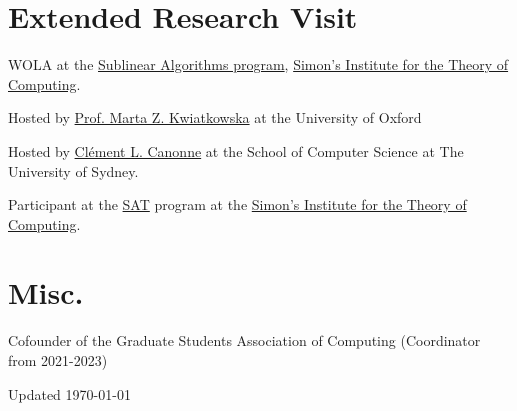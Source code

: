 \documentclass[12pt,letterpaper]{report}
\begin{document}
	\section*{ Extended Research Visit}
	\begin{tablist}
		
		
		\item[2024]
		WOLA at the \href{https://simons.berkeley.edu/programs/sublinear-algorithms/}{Sublinear Algorithms program}, \href{https://simons.berkeley.edu/}{Simon's Institute for the Theory of Computing}.
		
		\item[2024]    Hosted by  \href{https://ccanonne.github.io/}{Prof. Marta Z. Kwiatkowska} at the University of Oxford
		
		\item[2023]
		Hosted by \href{https://ccanonne.github.io/}{Clément L. Canonne} at the School of Computer Science at The University of Sydney. 
		
		\item[2022]
		Participant at the \href{https://simons.berkeley.edu/programs/sat2021}{SAT} program at the \href{https://simons.berkeley.edu/}{Simon's Institute for the Theory of Computing}.
		
	\end{tablist}
	
	\section*{Misc.}
	\begin{tablist}
		\item[2021] Cofounder of the Graduate Students Association of Computing (Coordinator from 2021-2023)
	\end{tablist}
	
	\begin{center}
		\vfill
		Updated \monthyeardate\today
	\end{center}
\end{document}
